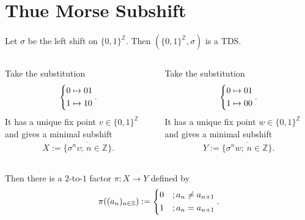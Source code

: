 \section{Thue Morse Subshift}

\begin{frame}
	Let $\sigma$ be the left shift on $\{0, 1\}^\mathbb{Z}$. Then $(\{0, 1\}^\mathbb{Z}, \sigma)$ is a TDS.\pause
	\begin{columns}
		\begin{column}{.5\textwidth}
			\begin{example}
				Take the substitution
				\begin{align*}
					\begin{dcases}
						0 \mapsto 01\\
						1 \mapsto 10
					\end{dcases}.
				\end{align*}\pause
				It has a unique fix point $v \in \{0, 1\}^\mathbb{Z}$ and gives a minimal subshift
				\begin{align*}
					X := \overline{\{\sigma^nv;\ n \in \mathbb{Z}\}}.
				\end{align*}
			\end{example}\pause
		\end{column}
		\begin{column}{.5\textwidth}
			\begin{example}
				Take the substitution
				\begin{align*}
					\begin{dcases}
						0 \mapsto 01\\
						1 \mapsto 00
					\end{dcases}.
				\end{align*}\pause
				It has a unique fix point $w \in \{0, 1\}^\mathbb{Z}$ and gives a minimal subshift
				\begin{align*}
					Y := \overline{\{\sigma^nw;\ n \in \mathbb{Z}\}}.
				\end{align*}
			\end{example}\pause
		\end{column}
	\end{columns}
	\medskip

	Then there is a $2$-to-$1$ factor $\pi: X \to Y$ defined by
	\begin{align*}
		\pi((a_n)_{n \in \mathbb{Z}}) :=
		\begin{dcases}
			0 &; a_n \neq a_{n+1}\\
			1 &; a_n = a_{n+1}
		\end{dcases}.
	\end{align*} 
\end{frame}

